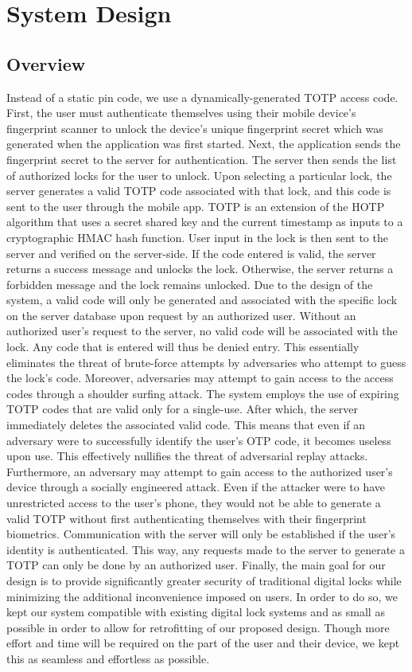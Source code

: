 \documentclass[conference]{IEEEtran}
\begin{document}
\section{System Design}
\subsection{Overview}
	Instead of a static pin code, we use a dynamically-generated TOTP access code. First, the user must authenticate themselves using their mobile device’s fingerprint scanner to unlock the device’s unique fingerprint secret which was generated when the application was first started. Next, the application sends the fingerprint secret to the server for authentication. The server then sends the list of authorized locks for the user to unlock. Upon selecting a particular lock, the server generates a valid TOTP code associated with that lock, and this code is sent to the user through the mobile app. TOTP is an extension of the HOTP algorithm that uses a secret shared key and the current timestamp as inputs to a cryptographic HMAC hash function. User input in the lock is then sent to the server and verified on the server-side. If the code entered is valid, the server returns a success message and unlocks the lock. Otherwise, the server returns a forbidden message and the lock remains unlocked.
	Due to the design of the system, a valid code will only be generated and associated with the specific lock on the server database upon request by an authorized user. Without an authorized user’s request to the server, no valid code will be associated with the lock. Any code that is entered will thus be denied entry. This essentially eliminates the threat of brute-force attempts by adversaries who attempt to guess the lock’s code. 
Moreover, adversaries may attempt to gain access to the access codes through a shoulder surfing attack. The system employs the use of expiring TOTP codes that are valid only for a single-use. After which, the server immediately deletes the associated valid code. This means that even if an adversary were to successfully identify the user’s OTP code, it becomes useless upon use. This effectively nullifies the threat of adversarial replay attacks.
	Furthermore, an adversary may attempt to gain access to the authorized user’s device through a socially engineered attack. Even if the attacker were to have unrestricted access to the user’s phone, they would not be able to generate a valid TOTP without first authenticating themselves with their fingerprint biometrics. Communication with the server will only be established if the user’s identity is authenticated. This way, any requests made to the server to generate a TOTP can only be done by an authorized user.
	Finally, the main goal for our design is to provide significantly greater security of traditional digital locks while minimizing the additional inconvenience imposed on users. In order to do so, we kept our system compatible with existing digital lock systems and as small as possible in order to allow for retrofitting of our proposed design. Though more effort and time will be required on the part of the user and their device, we kept this as seamless and effortless as possible. 
\end{document}
